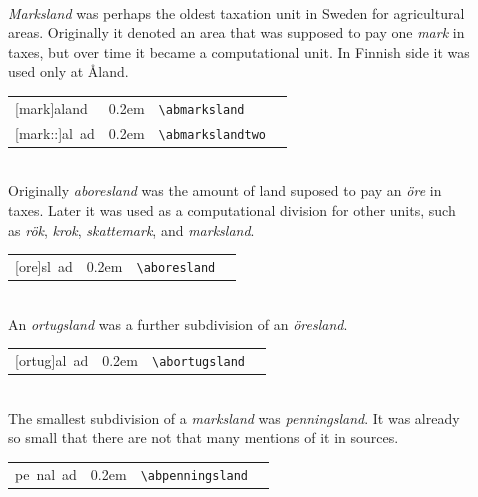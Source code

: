 \documentclass[a4paper]{article}
\newcommand{\samplefont}{\fontsize{16}{16}\abcursivefamily\spaceskip0.2em}
\newcommand{\sample}[1]{{\samplefont #1 \strut}}
\newcommand{\ltxncmd}[1]{\texttt{\textbackslash{}#1}}
\begin{document}
\begin{description}
\item [\sample{\abmarksland}, \emph{marksland}, \emph{markanmaa}] \mbox{} \\
  \emph{Marksland} was perhaps the oldest taxation unit in Sweden for
  agricultural areas. Originally it denoted an area that was supposed
  to pay one \emph{mark} in taxes, but over time it became a
  computational unit. In Finnish side it was used only at Åland.
  \begin{center}
    \begin{tabular}{llll}
      {}[mark]aland & \sample{\abmarksland} & \ltxncmd{abmarksland} \\
      {}[mark::]al~ad & \sample{\abmarkslandtwo} & \ltxncmd{abmarkslandtwo} \\
    \end{tabular}
  \end{center}

  
\item [\sample{\aboresland}, \emph{öresland}, \emph{äyrinmaa}] \mbox{} \\
  Originally \emph{aboresland} was the amount of land suposed to pay
  an \emph{öre} in taxes. Later it was used as a computational
  division for other units, such as \emph{rök}, \emph{krok},
  \emph{skattemark}, and \emph{marksland}. 
  \begin{center}
    \begin{tabular}{llll}
      {}[ore]sl~ad & \sample{\aboresland} & \ltxncmd{aboresland} \\
    \end{tabular}
  \end{center}

\item [\sample{\abortugsland}, \emph{örtugsland}, \emph{aurtuanmaa}] \mbox{} \\
  An \emph{ortugsland} was a further subdivision of an \emph{öresland}. 
  \begin{center}
    \begin{tabular}{llll}
      {}[ortug]al~ad & \sample{\abortugsland} & \ltxncmd{abortugsland} \\
    \end{tabular}
  \end{center}

\item [\sample{\abpenningsland}, \emph{penningsland},
  \emph{penninmaa}]
  \mbox{} \\
  The smallest subdivision of a \emph{marksland} was
  \emph{penningsland}. It was already so small that there are not that
  many mentions of it in sources.
  \begin{center}
    \begin{tabular}{llll}
      {}pe~nal~ad & \sample{\abpenningsland} & \ltxncmd{abpenningsland} \\
    \end{tabular}
  \end{center}




\end{description}
\end{document}
